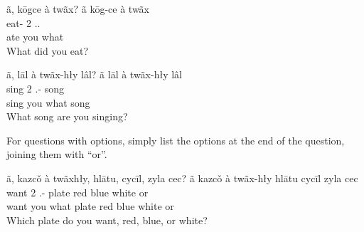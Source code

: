\begin{exe}
    \ex
    \glt
    ã, kōgce à twãx?
    \glll
    ã kōg-ce à twãx \\
    \Q{} eat-\Pst{} 2\Sg{} \Int{}.\Inanim{}.\Sg{} \\
    \Q{} ate you what \\
    \glt
    What did you eat?
\end{exe}

\begin{exe}
    \ex
    \glt
    ã, lāl à twãx-hły lâl?
    \glll
    ã lāl à twãx-hły lâl \\
    \Q{} sing 2\Sg{} \Int{}.\Inanim{}-\Adj{} song \\
    \Q{} sing you what song \\
    \glt
    What song are you singing?
\end{exe}

For questions with options,
simply list the options at the end of the question,
joining them with ``or''.

\begin{exe}
    \ex
    ã, kazcǒ à twãxhły, hlātu, cycīl, zyla cec?
    \glll
    ã kazcǒ à twãx-hły hlātu cycīl zyla cec \\
    \Q{} want 2\Sg{} \Int{}.\Inanim{}-\Adj{} plate red blue white or \\
    \Q{} want you what plate red blue white or \\
    \glt
    Which plate do you want, red, blue, or white?
\end{exe}

